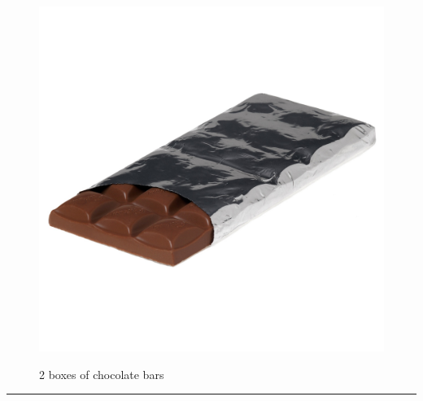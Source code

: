 \documentclass{article}
\begin{document}
    \begin{figure}[H]
        \centering
        \begin{minipage}{0.25\textwidth}
            \centering
            \includegraphics[width=\textwidth]{../SurvivalItemImages/chocolate}
        \end{minipage}\hfill
        \begin{minipage}{0.7\textwidth}
            \centering
            \Large 2 boxes of chocolate bars
        \end{minipage}
    \end{figure}
    \vspace{-0.8em}
    \noindent\rule{\textwidth}{0.4pt}
            
\end{document}
